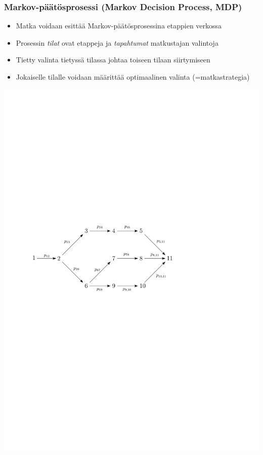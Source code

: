\documentclass{beamer}
\begin{document}
    
    
        \begin{frame}
  \frametitle{Markov-päätösprosessi (Markov Decision Process, MDP)} 
  \begin{itemize}
   \item 
    Matka voidaan esittää Markov-päätösprosessina etappien verkossa
    \item
    Prosessin \emph{tilat} ovat etappeja ja \emph{tapahtumat} matkustajan valintoja 
    \item
    Tietty valinta tietyssä tilassa johtaa toiseen tilaan siirtymiseen
    \item
    Jokaiselle tilalle voidaan määrittää optimaalinen valinta (=matkastrategia) 
\end{itemize}
     \begin{center}
     \includegraphics[scale=0.55]{walking01c}
      \end{center}
    \end{frame} 
    
\end{document}
